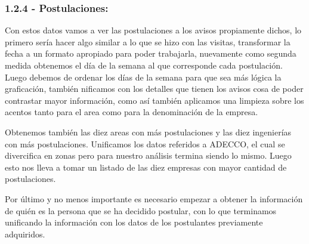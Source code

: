 \documentclass[11pt]{article}
\begin{document}
    \hypertarget{postulaciones}{%
\subsubsection{1.2.4 - Postulaciones:}\label{postulaciones}}

Con estos datos vamos a ver las postulaciones a los avisos propiamente
dichos, lo primero sería hacer algo similar a lo que se hizo con las
visitas, transformar la fecha a un formato apropiado para poder
trabajarla, nuevamente como segunda medida obtenemos el día de la semana
al que corresponde cada postulación. Luego debemos de ordenar los días
de la semana para que sea más lógica la graficación, también nificamos
con los detalles que tienen los avisos cosa de poder contrastar mayor
información, como así también aplicamos una limpieza sobre los acentos
tanto para el area como para la denominación de la empresa.

Obtenemos también las diez areas con más postulaciones y las diez
ingenierías con más postulaciones. Unificamos los datos referidos a
ADECCO, el cual se divercifica en zonas pero para nuestro análisis
termina siendo lo mismo. Luego esto nos lleva a tomar un listado de las
diez empresas con mayor cantidad de postulaciones.

Por último y no menos importante es necesario empezar a obtener la
información de quién es la persona que se ha decidido postular, con lo
que terminamos unificando la información con los datos de los
postulantes previamente adquiridos.
\end{document}
